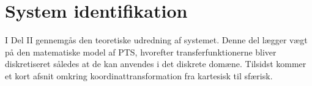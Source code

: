 \part{System identifikation}
I Del II gennemgås den teoretiske udredning af systemet. Denne del lægger vægt på den matematiske model af PTS, hvorefter transferfunktionerne bliver diskretiseret således at de kan anvendes i det diskrete domæne.
Tilsidst kommer et kort afsnit omkring koordinattransformation fra kartesisk til sfærisk.



